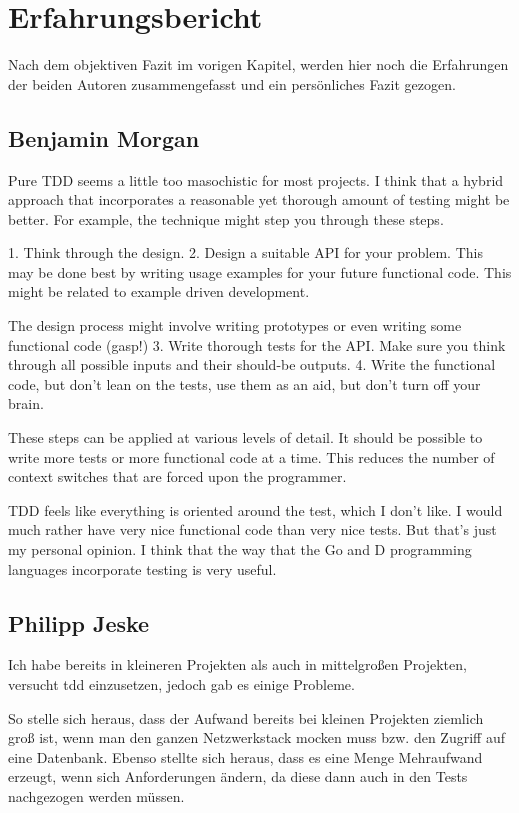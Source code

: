 \documentclass{mitschrift}
\newcommand{\pje}{\marginpar{Philipp\\Jeske}}
\newcommand{\bmn}{\marginpar{Benjamin\\Morgan}}
\begin{document}
\chapter{Erfahrungsbericht}
Nach dem objektiven Fazit im vorigen Kapitel, werden hier noch die Erfahrungen
der beiden Autoren zusammengefasst und ein persönliches Fazit gezogen.

\section{Benjamin Morgan}
\bmn
Pure TDD seems a little too masochistic for most projects. I think that a
hybrid approach that incorporates a reasonable yet thorough amount of
testing might be better. For example, the technique might step you through
these steps.

 1. Think through the design.
 2. Design a suitable API for your problem. This may be done best by writing
    usage examples for your future functional code. This might be related to
    example driven development.

    The design process might involve writing prototypes or even writing some
    functional code (gasp!)
 3. Write thorough tests for the API. Make sure you think through all
    possible inputs and their should-be outputs.
 4. Write the functional code, but don't lean on the tests, use them as an
    aid, but don't turn off your brain.

These steps can be applied at various levels of detail. It should be
possible to write more tests or more functional code at a time. This reduces
the number of context switches that are forced upon the programmer.

TDD feels like everything is oriented around the test, which I don't like.
I would much rather have very nice functional code than very nice tests.
But that's just my personal opinion. I think that the way that the Go and
D programming languages incorporate testing is very useful.

\section{Philipp Jeske}
\pje
Ich habe bereits in kleineren Projekten als auch in mittelgroßen Projekten,
versucht \gls{tdd} einzusetzen, jedoch gab es einige Probleme. 

So stelle sich heraus, dass der Aufwand bereits bei kleinen Projekten ziemlich
groß ist, wenn man den ganzen Netzwerkstack mocken muss bzw. den Zugriff auf
eine Datenbank. Ebenso stellte sich heraus, dass es eine Menge Mehraufwand
erzeugt, wenn sich Anforderungen ändern, da diese dann auch in den Tests
nachgezogen werden müssen.
\end{document}
